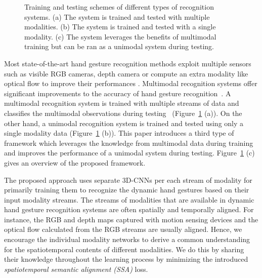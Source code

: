 \documentclass[10pt,twocolumn,letterpaper]{article}
\begin{document}
\begin{figure}
\begin{center}
\end{center}
   \caption{Training and testing schemes of different types of recognition systems. (a) The system is trained and tested with multiple modalities. (b) The system is trained and tested with a single modality. (c) The system leverages the benefits of multimodal training but can be ran as a unimodal system during testing. }
\label{fig:definition}
\end{figure}

Most state-of-the-art hand gesture recognition methods exploit multiple sensors such as visible RGB cameras, depth camera or compute an extra modality like optical flow to improve their performances \cite{li2017lpsnet,zhang2017learning,wang2017large,miao2017multimodal}.  Multimodal recognition systems offer significant improvements to the accuracy of hand gesture recognition~\cite{molchanov2015multi}.  A multimodal recognition system is trained with multiple streams of data and classifies the multimodal observations during testing~\cite{ramachandram2017deep,babagholami2014multi} (Figure~\ref{fig:definition} (a)). On the other hand,  a unimodal recognition system is trained and tested using only a single modality data (Figure~\ref{fig:definition} (b)).   This paper introduces a third type of framework which leverages the knowledge from multimodal data during training and improves the performance of a unimodal system during testing.  Figure~\ref{fig:definition} (c) gives an overview of the  proposed framework. 

The proposed approach uses separate 3D-CNNs per each stream of modality for primarily training them to recognize the dynamic hand gestures based on their input modality streams.  The streams of modalities that are available in dynamic hand gesture recognition systems are often spatially and temporally aligned. For instance, the RGB and depth maps captured with motion sensing devices and the optical flow calculated from the RGB streams are usually aligned.  Hence, we encourage the individual modality networks to derive a common understanding for the spatiotemporal contents of different modalities.  We do this by sharing their knowledge throughout the learning process by minimizing the introduced \emph{spatiotemporal semantic alignment (SSA)} loss.    
\end{document}
